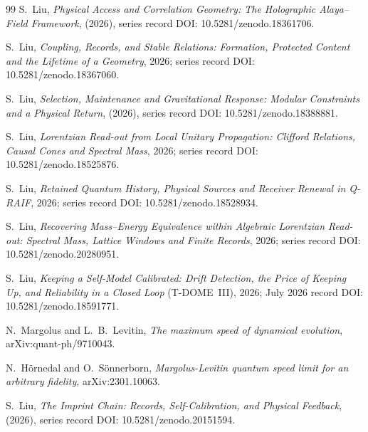 \documentclass[aps,pre,onecolumn,superscriptaddress,floatfix,longbibliography]{revtex4-2}
\begin{document}
\begin{thebibliography}{99}
S.~Liu, \emph{Physical Access and Correlation Geometry: The Holographic Alaya--Field Framework}, (2026), series record DOI: 10.5281/zenodo.18361706.

S.~Liu, \emph{Coupling, Records, and Stable Relations: Formation, Protected Content and the Lifetime of a Geometry}, 2026; series record DOI: 10.5281/zenodo.18367060.

S.~Liu, \emph{Selection, Maintenance and Gravitational Response: Modular Constraints and a Physical Return}, (2026), series record DOI: 10.5281/zenodo.18388881.

S.~Liu, \emph{Lorentzian Read-out from Local Unitary Propagation: Clifford Relations, Causal Cones and Spectral Mass}, 2026; series record DOI: 10.5281/zenodo.18525876.

S.~Liu, \emph{Retained Quantum History, Physical Sources and Receiver Renewal in Q-RAIF}, 2026; series record DOI: 10.5281/zenodo.18528934.

S.~Liu, \emph{Recovering Mass--Energy Equivalence within Algebraic Lorentzian Read-out: Spectral Mass, Lattice Windows and Finite Records}, 2026; series record DOI: 10.5281/zenodo.20280951.

S.~Liu, \emph{Keeping a Self-Model Calibrated: Drift Detection, the Price of Keeping Up, and Reliability in a Closed Loop} (T-DOME~III), 2026; July 2026 record DOI: 10.5281/zenodo.18591771.

N.~Margolus and L.~B.~Levitin, \emph{The maximum speed of dynamical evolution}, arXiv:quant-ph/9710043.

N.~H\"ornedal and O.~S\"onnerborn, \emph{Margolus-Levitin quantum speed limit for an arbitrary fidelity}, arXiv:2301.10063.

S.~Liu, \emph{The Imprint Chain: Records, Self-Calibration, and Physical Feedback}, (2026), series record DOI: 10.5281/zenodo.20151594.

\end{thebibliography}
\end{document}
